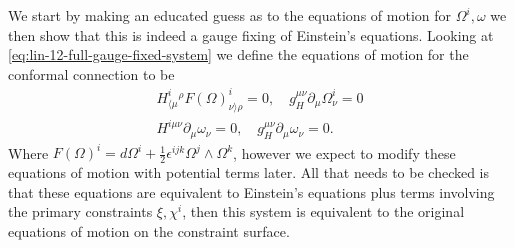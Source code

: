 \documentclass[10pt]{report}
\theoremstyle{definition}
\begin{document}
        We start by making an educated guess as to the equations of motion for $\Omega^i, \omega$ we then show that this is indeed a gauge fixing of Einstein's equations. Looking at \cref{eq:lin-12-full-gauge-fixed-system} we define the equations of motion for the conformal connection to be
        \begin{gather}
            H^i_{\langle \mu}{}^\rho F(\Omega)^i_{\nu\rangle\rho} = 0, \quad g_H^{\mu\nu} \partial_\mu \Omega^i_\nu = 0 \label{eq:nonlinear-pleb-12-connection-eoms}\\
            H^{i\mu\nu} \partial_\mu \omega_\nu = 0, \quad g_H^{\mu\nu} \partial_\mu \omega_\nu = 0 \label{eq:nonlinear-pleb-4-connection-eoms}.
        \end{gather}
        Where $F(\Omega)^i = d\Omega^i + \frac{1}{2} \epsilon^{ijk} \Omega^j \wedge \Omega^k$, however we expect to modify these equations of motion with potential terms later. All that needs to be checked is that these equations are equivalent to Einstein's equations plus terms involving the primary constraints $\xi, \chi^i$, then this system is equivalent to the original equations of motion  on the constraint surface.
\end{document}
